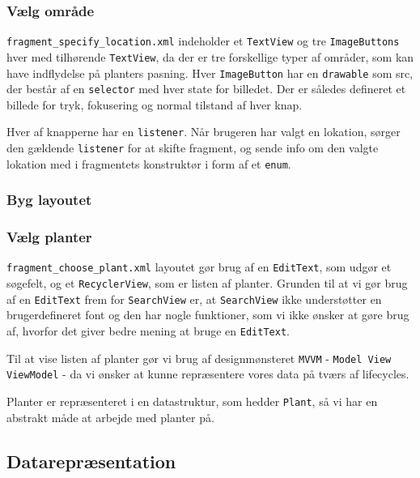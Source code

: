 \subsubsection{Vælg område}
\texttt{fragment\_specify\_location.xml} indeholder et \texttt{TextView} og tre \texttt{ImageButtons} hver med tilhørende \texttt{TextView}, da der er tre forskellige typer af områder, som kan have indflydelse på planters pasning. Hver \texttt{ImageButton} har en \texttt{drawable} som src, der består af en \texttt{selector} med hver state for billedet. Der er således defineret et billede for tryk, fokusering og normal tilstand af hver knap.

Hver af knapperne har en \texttt{listener}. Når brugeren har valgt en lokation, sørger den gældende \texttt{listener} for at skifte fragment, og sende info om den valgte lokation med i fragmentets konstruktør i form af et \texttt{enum}.

\subsubsection{Byg layoutet}

\subsubsection{Vælg planter}

\texttt{fragment\_choose\_plant.xml} layoutet gør brug af en \texttt{EditText}, som udgør et søgefelt, og et \texttt{RecyclerView}, som er listen af planter.
Grunden til at vi gør brug af en \texttt{EditText} frem for \texttt{SearchView} er, at \texttt{SearchView} ikke understøtter en brugerdefineret font og den har nogle funktioner, som vi ikke ønsker at gøre brug af, hvorfor det giver bedre mening at bruge en \texttt{EditText}.

Til at vise listen af planter gør vi brug af designmønsteret \texttt{MVVM} - \texttt{Model View ViewModel} - da vi ønsker at kunne repræsentere vores data på tværs af lifecycles.

Planter er repræsenteret i en datastruktur, som hedder \texttt{Plant}, så vi har en abstrakt måde at arbejde med planter på.

\subsection{Datarepræsentation}


